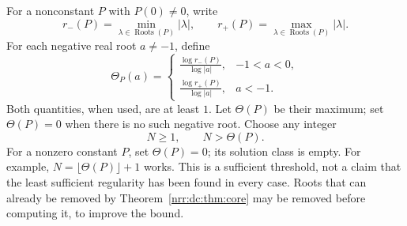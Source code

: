 \documentclass[11pt,letterpaper]{article}
\theoremstyle{definition}
\theoremstyle{remark}
\newcommand{\roots}{\operatorname{Roots}}
\begin{document}
For a nonconstant $P$ with $P(0)\ne0$, write
\[
 r_-(P)=\min_{\lambda\in\roots(P)}|\lambda|,
 \qquad r_+(P)=\max_{\lambda\in\roots(P)}|\lambda|.
\]
For each negative real root $a\ne-1$, define
\begin{equation}
 \Theta_P(a)=
 \begin{cases}
 \displaystyle\frac{\log r_-(P)}{\log|a|},&-1<a<0,\\[7pt]
 \displaystyle\frac{\log r_+(P)}{\log|a|},&a<-1.
 \end{cases}
 \label{nrr:dc:eq:threshold-ratio}
\end{equation}
Both quantities, when used, are at least $1$. Let $\Theta(P)$ be their
maximum; set $\Theta(P)=0$ when there is no such negative root. Choose any
integer
\begin{equation}
 N\ge1,\qquad N>\Theta(P).
 \label{nrr:dc:eq:N}
\end{equation}
For a nonzero constant $P$, set $\Theta(P)=0$; its solution class is empty.
For example, $N=\lfloor \Theta(P)\rfloor+1$ works. This is a sufficient
threshold, not a claim that the least sufficient regularity has been
found in every case. Roots that can already be removed by
Theorem~\ref{nrr:dc:thm:core} may be removed before computing it, to improve
the bound.
\end{document}
